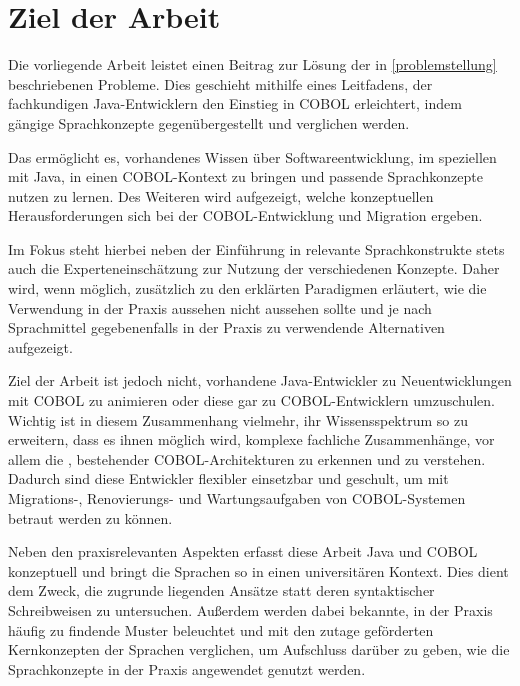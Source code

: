 \section{Ziel der Arbeit}
Die vorliegende Arbeit leistet einen Beitrag zur Lösung der in \autoref{problemstellung} beschriebenen Probleme. Dies geschieht mithilfe eines Leitfadens, der fachkundigen Java-Entwicklern den Einstieg in COBOL erleichtert, indem gängige Sprachkonzepte gegenübergestellt und verglichen werden. 

Das ermöglicht es, vorhandenes Wissen über Softwareentwicklung, im speziellen mit Java, in einen COBOL-Kontext zu bringen und passende Sprachkonzepte nutzen zu lernen. Des Weiteren wird aufgezeigt, welche konzeptuellen Herausforderungen sich bei der COBOL-Entwicklung und Migration ergeben.

Im Fokus steht hierbei neben der Einführung in relevante Sprachkonstrukte stets auch die Experteneinschätzung zur Nutzung der verschiedenen Konzepte. Daher wird, wenn möglich, zusätzlich zu den erklärten Paradigmen erläutert, wie die Verwendung in der Praxis aussehen \bzw nicht aussehen sollte und je nach Sprachmittel gegebenenfalls in der Praxis zu verwendende Alternativen aufgezeigt.

Ziel der Arbeit ist jedoch nicht, vorhandene Java-Entwickler zu Neuentwicklungen mit COBOL zu animieren oder diese gar zu COBOL-Entwicklern umzuschulen. Wichtig ist in diesem Zusammenhang vielmehr, ihr Wissensspektrum so zu erweitern, dass es ihnen möglich wird, komplexe fachliche Zusammenhänge, vor allem die , bestehender COBOL-Architekturen zu erkennen und zu verstehen. Dadurch sind diese Entwickler flexibler einsetzbar und geschult, um mit Migrations-, Renovierungs- und Wartungsaufgaben von COBOL-Systemen betraut werden zu können.

Neben den praxisrelevanten Aspekten erfasst diese Arbeit Java und COBOL konzeptuell und bringt die Sprachen so in einen universitären Kontext. Dies dient dem Zweck, die zugrunde liegenden Ansätze statt deren syntaktischer Schreibweisen zu untersuchen. Außerdem werden dabei bekannte, in der Praxis häufig zu findende Muster beleuchtet und mit den zutage geförderten Kernkonzepten der Sprachen verglichen, um Aufschluss darüber zu geben, wie die Sprachkonzepte in der Praxis angewendet \bzw genutzt werden.